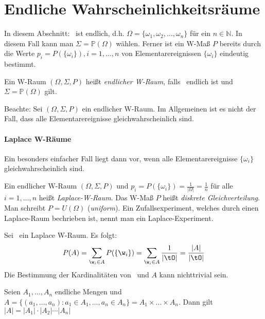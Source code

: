 
\section{Endliche Wahrscheinlichkeitsräume}
In diesem Abschnitt: \tO\ ist endlich, d.h. $\Omega = \{\omega_1, \omega_2, \dots, \omega_n\}$
für ein $n \in \mathbb{N}$.
In diesem Fall kann man $\Sigma = \mathbb{P}(\Omega)$ wählen.
Ferner ist ein W-Maß $P$ bereits durch die Werte $p_i = P(\{\omega_i\}), i=1,\dots,n$
von Elementarereignissen $\{\omega_i\}$ eindeutig bestimmt.

\begin{definition}
    Ein W-Raum $(\Omega, \Sigma,  P)$ heißt \emph{endlicher W-Raum}, falls \tO\ endlich ist und
    $\Sigma = \mathbb{P}(\Omega)$ gilt.
\end{definition}

Beachte: Sei $(\Omega, \Sigma, P)$ ein endlicher W-Raum. Im Allgemeinen ist es nicht der Fall, dass alle
Elementarereignisse gleichwahrscheinlich sind.

\paragraph{Laplace W-Räume} Ein besonders einfacher Fall liegt dann vor, wenn alle Elementarereignisse
$\{\omega_i\}$ gleichwahrscheinlich sind.

\begin{definition}
    Ein endlicher W-Raum $(\Omega, \Sigma, P)$ und $p_i = P(\{\omega_i\}) = \frac{1}{|\Omega|} = \frac{1}{n}$
    für alle $i=1,\dots,n$ heißt \emph{Laplace-W-Raum}.
    Das W-Maß $P$ heißt \emph{diskrete Gleichverteilung}.
    Man schreibt $P=U(\Omega)$ (\textit{uniform}).
    Ein Zufallsexperiment, welches durch einen Laplace-Raum bechrieben ist, nennt man ein
    Laplace-Experiment.
\end{definition}

Sei \wraum\ ein Laplace W-Raum. Es folgt:
\begin{equation*}
    P(A) = \sum_{\w_i \in A} P(\{\w_i\}) = \sum_{\w_i \in A} \frac{1}{|\tO|} = \frac{|A|}{|\tO|}
\end{equation*}
Die Bestimmung der Kardinalitäten von \tO\ und $A$ kann nichttrivial sein.

\begin{theorem}
    Seien $A_1, \dots ,A_n$ endliche Mengen und $A= \{ (a_1, \dots , a_n): a_1 \in A_1, \dots , a_n \in A_n \} = A_1 \times \dots \times A_n$.
    Dann gilt $|A| = |A_1| \cdot |A_2| \cdots |A_n|$
\end{theorem}

